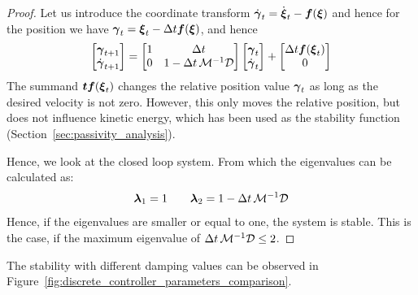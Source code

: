 \begin{proof}
Let us introduce the coordinate transform $\dot{\boldsymbol{\gamma}}_t = \dot{\boldsymbol{\xi}}_t - \boldsymbol{f}(\boldsymbol{\xi})$  and hence for the position we have $\boldsymbol{\gamma}_t = \boldsymbol{\xi}_t - \Delta t \boldsymbol{f}(\boldsymbol{\xi})$, and hence 
\begin{equation}
	\begin{split}
		\begin{bmatrix}
			\boldsymbol{\gamma}_{t+1} \\ \dot{\boldsymbol{\gamma}}_{t+1}
						\end{bmatrix}
	=	
	\begin{bmatrix}
		1 & \Delta t \\
		0 & 1 - \Delta t \, \mathcal{M}^{-1} \mathcal{D}
	\end{bmatrix}
	\begin{bmatrix}
		\boldsymbol{\gamma}_t \\ \dot{\boldsymbol{\gamma}}_t
	\end{bmatrix}
	+ \begin{bmatrix} 
	\Delta t \boldsymbol{f}(\boldsymbol{\xi}_t) \\ 0
    \end{bmatrix}
\end{split}
\end{equation}
The summand $\boldsymbol{t} \boldsymbol{f}(\boldsymbol{\xi}_t)$ changes the relative position value $\boldsymbol{\gamma}_t$ as long as the desired velocity is not zero. However, this only moves the relative position, but does not influence kinetic energy, which has been used as the stability function (Section~\ref{sec:passivity_analysis}).

Hence, we look at the closed loop system. From which the eigenvalues can be calculated as:
\begin{equation}
	\boldsymbol{\lambda}_1 = 1 \qquad \boldsymbol{\lambda}_2 = 1 - \Delta t \, \mathcal{M}^{-1} \mathcal{D}
\end{equation}
Hence, if the eigenvalues are smaller or equal to one, the system is stable. This is the case, if the maximum eigenvalue of $\Delta t \, \mathcal{M}^{-1} \mathcal{D} \leq 2$.
\end{proof}

The stability with different damping values can be observed in Figure~\ref{fig:discrete_controller_parameters_comparison}.

